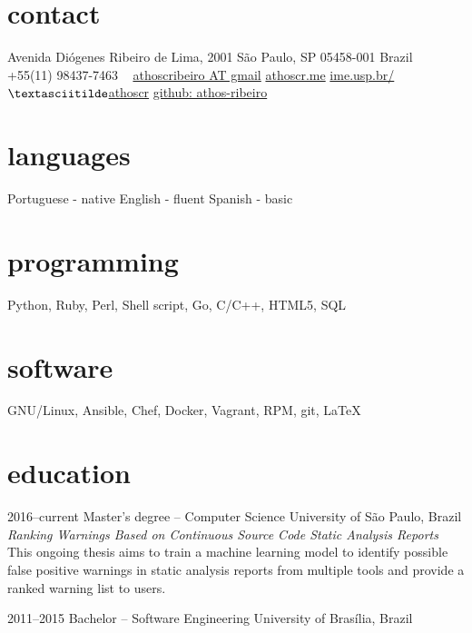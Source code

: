 \documentclass[print]{friggeri-cv}
\begin{document}


\begin{aside} %
\section{contact}
Avenida Diógenes Ribeiro de Lima, 2001
São Paulo, SP 05458-001
Brazil
~
+55(11) 98437-7463
~
\href{mailto:athoscribeiro@gmail.com}{athoscribeiro AT gmail}
\href{http://athoscr.me}{athoscr.me}
\href{https://www.ime.usp.br/~athoscr}{ime.usp.br/$\textasciitilde$athoscr}
\href{https://github.com/athos-ribeiro}{github: athos-ribeiro}
\section{languages}
Portuguese - native
English - fluent
Spanish - basic
\section{programming}
Python, Ruby, Perl, Shell script, Go, C/C++, HTML5, SQL
\section{software}
GNU/Linux, Ansible, Chef, Docker, Vagrant, RPM, git, \LaTeX
\end{aside}


\section{education}

\begin{entrylist}


\entry
{2016--current}
{Master's degree -- {\normalfont Computer Science}}
{University of São Paulo, Brazil}
  {\emph{Ranking Warnings Based on Continuous Source Code Static Analysis Reports} \\ This ongoing thesis aims to train a machine learning model to identify possible false positive warnings in static analysis reports from multiple tools and provide a ranked warning list to users.}


\entry
{2011--2015}
{Bachelor -- {\normalfont Software Engineering}}
{University of Brasília, Brazil}


\end{entrylist}
\end{document}
